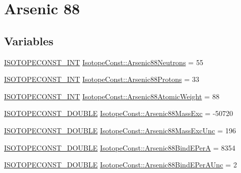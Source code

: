 \hypertarget{group___isotope_const-_arsenic-_as88}{}\section{Arsenic 88}
\label{group___isotope_const-_arsenic-_as88}
\subsection*{Variables}
\begin{DoxyCompactItemize}
\item 
\mbox{\hyperlink{group___isotope_const-_macros_ga5f18360b3e99483a35c32d789e62621c}{I\+S\+O\+T\+O\+P\+E\+C\+O\+N\+S\+T\+\_\+\+I\+NT}} \mbox{\hyperlink{group___isotope_const-_arsenic-_as88_ga02a341ac140f625dc6d72df604cc28e2}{Isotope\+Const\+::\+Arsenic88\+Neutrons}} = 55
\item 
\mbox{\hyperlink{group___isotope_const-_macros_ga5f18360b3e99483a35c32d789e62621c}{I\+S\+O\+T\+O\+P\+E\+C\+O\+N\+S\+T\+\_\+\+I\+NT}} \mbox{\hyperlink{group___isotope_const-_arsenic-_as88_ga279561ed92c9236eea5031d723e1a3ec}{Isotope\+Const\+::\+Arsenic88\+Protons}} = 33
\item 
\mbox{\hyperlink{group___isotope_const-_macros_ga5f18360b3e99483a35c32d789e62621c}{I\+S\+O\+T\+O\+P\+E\+C\+O\+N\+S\+T\+\_\+\+I\+NT}} \mbox{\hyperlink{group___isotope_const-_arsenic-_as88_gaa2c54028a54e466fc0b7fba1e287c999}{Isotope\+Const\+::\+Arsenic88\+Atomic\+Weight}} = 88
\item 
\mbox{\hyperlink{group___isotope_const-_macros_ga8f45a7272ce02c0b4c65c44636ed719a}{I\+S\+O\+T\+O\+P\+E\+C\+O\+N\+S\+T\+\_\+\+D\+O\+U\+B\+LE}} \mbox{\hyperlink{group___isotope_const-_arsenic-_as88_ga4738115ac1ca8b2cb3cc28bbb4a37023}{Isotope\+Const\+::\+Arsenic88\+Mass\+Exc}} = -\/50720
\item 
\mbox{\hyperlink{group___isotope_const-_macros_ga8f45a7272ce02c0b4c65c44636ed719a}{I\+S\+O\+T\+O\+P\+E\+C\+O\+N\+S\+T\+\_\+\+D\+O\+U\+B\+LE}} \mbox{\hyperlink{group___isotope_const-_arsenic-_as88_ga73609556b781dca8b20da0f55040770f}{Isotope\+Const\+::\+Arsenic88\+Mass\+Exc\+Unc}} = 196
\item 
\mbox{\hyperlink{group___isotope_const-_macros_ga8f45a7272ce02c0b4c65c44636ed719a}{I\+S\+O\+T\+O\+P\+E\+C\+O\+N\+S\+T\+\_\+\+D\+O\+U\+B\+LE}} \mbox{\hyperlink{group___isotope_const-_arsenic-_as88_ga545a8a5293785f99f6bee1fa909f84d8}{Isotope\+Const\+::\+Arsenic88\+Bind\+E\+PerA}} = 8354
\item 
\mbox{\hyperlink{group___isotope_const-_macros_ga8f45a7272ce02c0b4c65c44636ed719a}{I\+S\+O\+T\+O\+P\+E\+C\+O\+N\+S\+T\+\_\+\+D\+O\+U\+B\+LE}} \mbox{\hyperlink{group___isotope_const-_arsenic-_as88_ga0f822e188a802b6f394c93a734cd5432}{Isotope\+Const\+::\+Arsenic88\+Bind\+E\+Per\+A\+Unc}} = 2

\end{DoxyCompactItemize}
